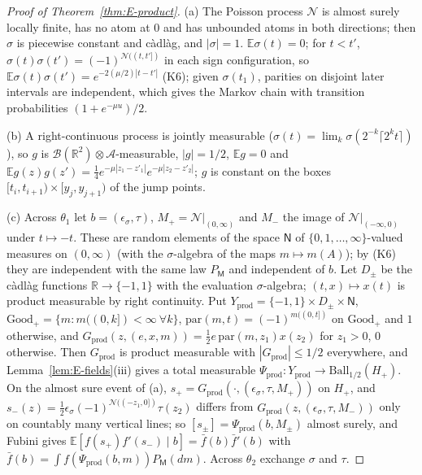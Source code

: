 \documentclass[11pt]{article}
\theoremstyle{plain}
\theoremstyle{definition}
\theoremstyle{remark}
\newcommand{\R}{\mathbb{R}}
\newcommand{\E}{\mathbb{E}}
\newcommand{\cB}{\mathcal{B}}
\newcommand{\cN}{\mathcal{N}}
\newcommand{\cA}{\mathcal{A}}
\newcommand{\Ball}{\mathrm{Ball}}
\begin{document}
\begin{proof}[Proof of Theorem~\ref{thm:E-product}]
(a) The Poisson process $\cN$ is almost surely locally finite, has no atom at $0$ and
has unbounded atoms in both directions; then $\sigma$ is piecewise constant and
c\`adl\`ag, and $|\sigma|=1$. $\E\sigma(t)=0$; for $t<t'$, $\sigma(t)\sigma(t')=(-1)^{\cN((t,t'])}$ in each sign
configuration, so $\E\sigma(t)\sigma(t')=e^{-2(\mu/2)|t-t'|}$ (K6); given $\sigma(t_1)$, parities on disjoint
later intervals are independent, which gives the Markov chain with transition
probabilities $(1+e^{-\mu u})/2$.

(b) A right-continuous process is jointly measurable
($\sigma(t)=\lim_k\sigma(2^{-k}\lceil2^{k}t\rceil)$), so $g$ is $\cB(\R^{2})\otimes\cA$-measurable, $|g|=1/2$,
$\E g=0$ and $\E g(z)g(z')=\tfrac14e^{-\mu|z_1-z'_1|}e^{-\mu|z_2-z'_2|}$; $g$ is constant on the boxes
$[t_i,t_{i+1})\times[y_j,y_{j+1})$ of the jump points.

(c) Across $\theta_1$ let $b=(\epsilon_\sigma,\tau)$, $M_+=\cN|_{(0,\infty)}$ and $M_-$ the image of $\cN|_{(-\infty,0)}$
under $t\mapsto-t$. These are random elements of the space $\mathsf N$ of
$\{0,1,\dots,\infty\}$-valued measures on $(0,\infty)$ (with the $\sigma$-algebra of the maps
$m\mapsto m(A)$); by (K6) they are independent with the same law $P_{\mathsf M}$ and independent of
$b$. Let $D_\pm$ be the c\`adl\`ag functions $\R\to\{-1,1\}$ with the evaluation $\sigma$-algebra;
$(t,x)\mapsto x(t)$ is product measurable by right continuity. Put
$Y_{\mathrm{prod}}=\{-1,1\}\times D_\pm\times\mathsf N$, $\mathrm{Good}_+=\{m:m((0,k])<\infty\ \forall k\}$,
$\mathrm{par}(m,t)=(-1)^{m((0,t])}$ on $\mathrm{Good}_+$ and $1$ otherwise, and
$G_{\mathrm{prod}}(z,(e,x,m))=\tfrac12e\,\mathrm{par}(m,z_1)x(z_2)$ for $z_1>0$, $0$ otherwise. Then $G_{\mathrm{prod}}$ is
product measurable with $|G_{\mathrm{prod}}|\le1/2$ everywhere, and Lemma~\ref{lem:E-fields}(iii) gives
a total measurable $\Psi_{\mathrm{prod}}:Y_{\mathrm{prod}}\to\Ball_{1/2}(H_+)$. On the almost sure event of (a),
$s_+=G_{\mathrm{prod}}(\cdot,(\epsilon_\sigma,\tau,M_+))$ on $H_+$, and $s_-(z)=\tfrac12\epsilon_\sigma(-1)^{\cN((-z_1,0])}\tau(z_2)$ differs
from $G_{\mathrm{prod}}(z,(\epsilon_\sigma,\tau,M_-))$ only on countably many vertical lines; so
$[s_\pm]=\Psi_{\mathrm{prod}}(b,M_\pm)$ almost surely, and Fubini gives
$\E[f(s_+)f'(s_-)\mid b]=\bar f(b)\bar f'(b)$ with $\bar f(b)=\int f(\Psi_{\mathrm{prod}}(b,m))P_{\mathsf M}(dm)$.
Across $\theta_2$ exchange $\sigma$ and $\tau$.


\end{proof}
\end{document}
